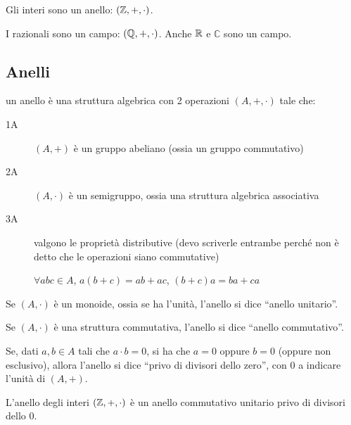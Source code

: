 Gli interi sono un anello: $\left( \mathbb{Z}, +, \cdot \right)$.

I razionali sono un campo: $\left( \mathbb{Q}, +, \cdot \right)$. Anche $\mathbb{R}$ e $\mathbb{C}$ sono un campo.

\subsection{Anelli}

un anello \`e una struttura algebrica con 2 operazioni $(A, +, \cdot)$ tale che:

\begin{description}
    \item[1A] $(A, +)$ \`e un gruppo abeliano (ossia un gruppo commutativo)
    \item[2A] $(A, \cdot)$ \`e un semigruppo, ossia una struttura algebrica associativa
    \item[3A] valgono le propriet\`a distributive (devo scriverle entrambe perch\'e non \`e detto che le operazioni siano commutative)

    $\forall a b c \in A$, $ a (b + c) = ab + ac$, $(b + c) a = b a + c a$
\end{description}

\begin{defn}
Se $ (A, \cdot)$ \`e un monoide, ossia se ha l'unit\`a, l'anello si dice ``anello unitario''.
\end{defn}
\begin{defn}
Se $(A, \cdot)$ \`e una struttura commutativa, l'anello si dice ``anello commutativo''.
\end{defn}
\begin{defn}
Se, dati $a, b \in A$ tali che $a \cdot b = 0$, si ha che $a = 0$ oppure $b = 0$ (oppure non esclusivo), allora l'anello si dice ``privo di divisori dello zero'', con 0 a indicare l'unit\`a di $(A, +)$.
\end{defn}

L'anello degli interi $(\mathbb{Z}, +, \cdot)$ \`e un anello commutativo unitario privo di divisori dello 0.

